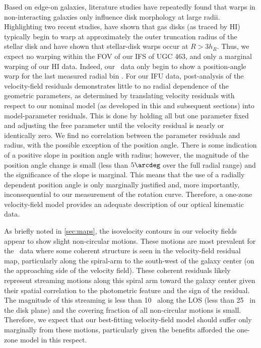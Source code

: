 \documentclass[apj,iop,numberedappendix]{emulateapj}
\begin{document}
Based on edge-on galaxies, literature studies have repeatedly found that warps
in non-interacting galaxies only influence disk morphology at large radii.
Highlighting two recent studies, \citet{2007A&A...466..883V} have shown that gas
disks (as traced by HI) typically begin to warp at approximately the outer
truncation radius of the stellar disk and \citet{2009MNRAS.396..409S} have shown
that stellar-disk warps occur at $R>3h_R$.  Thus, we expect no warping within
the FOV of our IFS of UGC 463, and only a marginal warping of our HI data.
Indeed, our \hone\ data only begin to show a position-angle warp for the last
measured radial bin \citep[$R=45\arcsec$;][]{TPKMPhD}.  For our IFU data,
post-analysis of the velocity-field residuals demonstrates little to no radial
dependence of the geometric parameters, as determined by translating velocity
residuals with respect to our nominal model (as developed in this and subsequent
sections) into model-parameter residuals.  This is done by holding all but one
parameter fixed and adjusting the free parameter until the velocity residual is
nearly or identically zero.  We find no correlation between the parameter
residuals and radius, with the possible exception of the position angle.  There
is some indication of a positive slope in position angle with radius; however,
the magnitude of the position angle change is small (less than $5\arcdeg$ over
the full radial range) and the significance of the slope is marginal.  This
means that the use of a radially dependent position angle is only marginally
justified and, more importantly, inconsequential to our measurement of the
rotation curve.  Therefore, a one-zone velocity-field model provides an adequate
description of our optical kinematic data.

As briefly noted in \sect \ref{sec:maps}, the isovelocity contours in our
velocity fields appear to show slight non-circular motions.  These motions are
most prevalent for the \halp\ data where some coherent structure is seen in the
velocity-field residual map, particularly along the spiral-arm to the south-west
of the galaxy center (on the approaching side of the velocity field).  These
coherent residuals likely represent streaming motions along this spiral arm
toward the galaxy center given their spatial correlation to the photometric
feature and the sign of the residual.  The magnitude of this streaming is less
than 10 \kms\ along the LOS (less than 25 \kms\ in the disk plane) and the
covering fraction of all non-circular motions is small.  Therefore, we expect
that our best-fitting velocity-field model should suffer only marginally from
these motions, particularly given the benefits afforded the one-zone model in
this respect.
\end{document}
